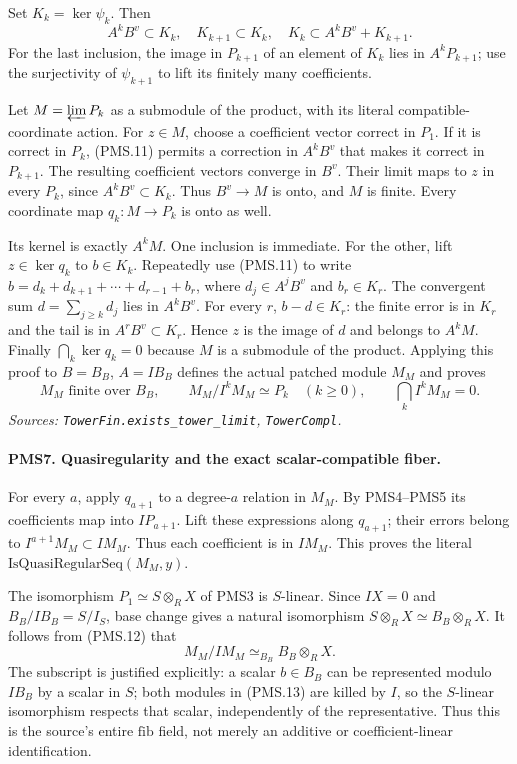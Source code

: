 Set $K_k=\ker\psi_k$.  Then
\[
 A^kB^v\subset K_k,\quad K_{k+1}\subset K_k,
 \quad K_k\subset A^kB^v+K_{k+1}.                \tag{PMS.11}
\]
For the last inclusion, the image in $P_{k+1}$ of an element of
$K_k$ lies in $A^kP_{k+1}$; use the surjectivity of $\psi_{k+1}$
to lift its finitely many coefficients.

Let $M=\varprojlim P_k$ as a submodule of the product, with its
literal compatible-coordinate action.  For $z\in M$, choose a
coefficient vector correct in $P_1$.  If it is correct in $P_k$,
(PMS.11) permits a correction in $A^kB^v$ that makes it correct
in $P_{k+1}$.  The resulting coefficient vectors converge in
$B^v$.  Their limit maps to $z$ in every $P_k$, since
$A^kB^v\subset K_k$.  Thus $B^v\to M$ is onto, and $M$ is finite.
Every coordinate map $q_k:M\to P_k$ is onto as well.

Its kernel is exactly $A^kM$.  One inclusion is immediate.  For
the other, lift $z\in\ker q_k$ to $b\in K_k$.  Repeatedly use
(PMS.11) to write
$b=d_k+d_{k+1}+\cdots+d_{r-1}+b_r$, where
$d_j\in A^jB^v$ and $b_r\in K_r$.
The convergent sum $d=\sum_{j\geq k}d_j$ lies in $A^kB^v$.
For every $r$, $b-d\in K_r$: the finite error is in $K_r$ and
the tail is in $A^rB^v\subset K_r$.
Hence $z$ is the image of $d$ and belongs to $A^kM$.
Finally $\bigcap_k\ker q_k=0$ because $M$ is a submodule of the
product.  Applying this proof to $B=B_B$, $A=IB_B$ defines the
actual patched module $M_M$ and proves
\[
 M_M\text{ finite over }B_B,\qquad
 M_M/I^kM_M\simeq P_k\quad(k\geq0),\qquad
 \bigcap_k I^kM_M=0.                             \tag{PMS.12}
\]
\hfill\textit{Sources: \texttt{TowerFin.exists\_tower\_limit},
\texttt{TowerCompl}.}

\paragraph{PMS7. Quasiregularity and the exact scalar-compatible fiber.}
\label{claim:PMS7}
For every $a$, apply $q_{a+1}$ to a degree-$a$ relation in $M_M$.
By PMS4--PMS5 its coefficients map into $IP_{a+1}$.  Lift these
expressions along $q_{a+1}$; their errors belong to
$I^{a+1}M_M\subset IM_M$.  Thus each coefficient is in $IM_M$.
This proves the literal $\mathrm{IsQuasiRegularSeq}(M_M,y)$.

The isomorphism $P_1\simeq S\otimes_R X$ of PMS3 is $S$-linear.
Since $IX=0$ and $B_B/IB_B=S/I_S$, base change gives a natural
isomorphism
$S\otimes_R X\simeq B_B\otimes_R X$.
It follows from (PMS.12) that
\[
 M_M/IM_M\simeq_{B_B} B_B\otimes_R X.            \tag{PMS.13}
\]
The subscript is justified explicitly: a scalar $b\in B_B$ can
be represented modulo $IB_B$ by a scalar in $S$; both modules in
(PMS.13) are killed by $I$, so the $S$-linear isomorphism respects
that scalar, independently of the representative.  Thus this is
the source's entire $\mathrm{fib}$ field, not merely an additive
or coefficient-linear identification.


